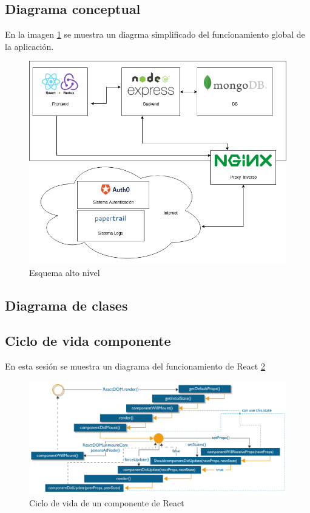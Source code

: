 \subsection {Diagrama conceptual}
En la imagen \ref{fig:esquema_alto_nivel} se muestra un diagrma simplificado del funcionamiento global de la aplicación.
\begin{figure}
  \begin{center}
    \includegraphics[width=\textwidth]{imagenes/diagrama_conceptual.png}
    \caption{Esquema alto nivel}
    \label{fig:esquema_alto_nivel}
  \end{center}
\end{figure}


\subsection {Diagrama de clases}
\subsection {Ciclo de vida componente}
En esta sesión se muestra un diagrama del funcionamiento de React \ref{fig:react}
\begin{figure}
  \begin{center}
    \includegraphics[width=\textwidth]{imagenes/ReactDOM_edureka.png}
    \caption{Ciclo de vida de un componente de React}
    \label{fig:react}
  \end{center}
\end{figure}

